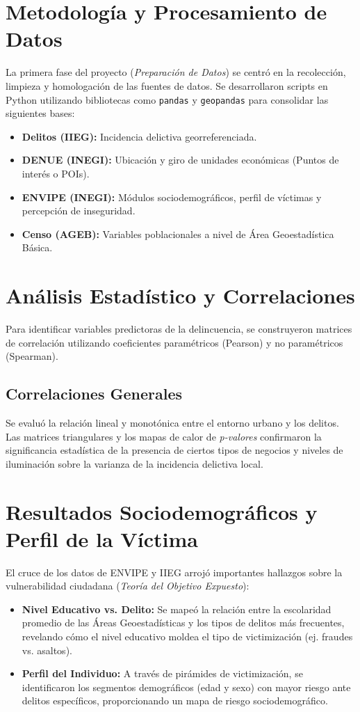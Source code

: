 \documentclass[12pt, a4paper]{article}
\begin{document}
\section{Metodología y Procesamiento de Datos}
La primera fase del proyecto (\textit{Preparación de Datos}) se centró en la recolección, limpieza y homologación de las fuentes de datos. Se desarrollaron scripts en Python utilizando bibliotecas como \texttt{pandas} y \texttt{geopandas} para consolidar las siguientes bases:
\begin{itemize}
    \item \textbf{Delitos (IIEG):} Incidencia delictiva georreferenciada.
    \item \textbf{DENUE (INEGI):} Ubicación y giro de unidades económicas (Puntos de interés o POIs).
    \item \textbf{ENVIPE (INEGI):} Módulos sociodemográficos, perfil de víctimas y percepción de inseguridad.
    \item \textbf{Censo (AGEB):} Variables poblacionales a nivel de Área Geoestadística Básica.
\end{itemize}

\section{Análisis Estadístico y Correlaciones}
Para identificar variables predictoras de la delincuencia, se construyeron matrices de correlación utilizando coeficientes paramétricos (Pearson) y no paramétricos (Spearman). 
\subsection{Correlaciones Generales}
Se evaluó la relación lineal y monotónica entre el entorno urbano y los delitos. Las matrices triangulares y los mapas de calor de \textit{p-valores} confirmaron la significancia estadística de la presencia de ciertos tipos de negocios y niveles de iluminación sobre la varianza de la incidencia delictiva local.

\section{Resultados Sociodemográficos y Perfil de la Víctima}
El cruce de los datos de ENVIPE y IIEG arrojó importantes hallazgos sobre la vulnerabilidad ciudadana (\textit{Teoría del Objetivo Expuesto}):
\begin{itemize}
    \item \textbf{Nivel Educativo vs. Delito:} Se mapeó la relación entre la escolaridad promedio de las Áreas Geoestadísticas y los tipos de delitos más frecuentes, revelando cómo el nivel educativo moldea el tipo de victimización (ej. fraudes vs. asaltos).
    \item \textbf{Perfil del Individuo:} A través de pirámides de victimización, se identificaron los segmentos demográficos (edad y sexo) con mayor riesgo ante delitos específicos, proporcionando un mapa de riesgo sociodemográfico.
\end{itemize}
\end{document}
